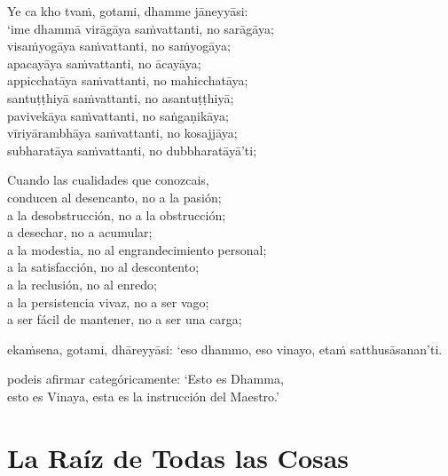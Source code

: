 Ye ca kho tvaṁ, gotami, dhamme jāneyyāsi:\\
‘ime dhammā virāgāya saṁvattanti, no sarāgāya;\\
visaṁyogāya saṁvattanti, no saṁyogāya;\\
apacayāya saṁvattanti, no ācayāya;\\
appicchatāya saṁvattanti, no mahicchatāya;\\
santuṭṭhiyā saṁvattanti, no asantuṭṭhiyā;\\
pavivekāya saṁvattanti, no saṅgaṇikāya;\\
vīriyārambhāya saṁvattanti, no kosajjāya;\\
subharatāya saṁvattanti, no dubbharatāyā’ti;

\begin{english}
  Cuando las cualidades que conozcais,\\
  conducen al desencanto, no a la pasión;\\
  a la desobstrucción, no a la obstrucción;\\
  a desechar, no a acumular;\\
  a la modestia, no al engrandecimiento personal;\\
  a la satisfacción, no al descontento;\\
  a la reclusión, no al enredo;\\
  a la persistencia vivaz, no a ser vago;\\
  a ser fácil de mantener, no a ser una carga;
\end{english}

ekaṁsena, gotami, dhāreyyāsi: ‘eso dhammo, eso vinayo, etaṁ satthusāsanan’ti.

\begin{english}
  podeis afirmar categóricamente: ‘Esto es Dhamma,\\
  esto es Vinaya, esta es la instrucción del Maestro.’
\end{english}

\chapter{La Raíz de Todas las Cosas}



